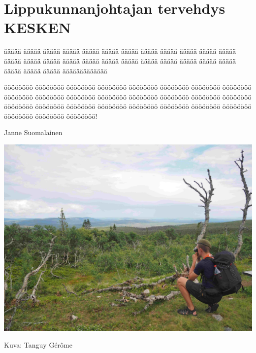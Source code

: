 \section{Lippukunnanjohtajan tervehdys KESKEN}


\begin{multicols}{2}


\noindent äääää äääää äääää äääää äääää äääää äääää äääää äääää äääää äääää äääää äääää äääää äääää äääää äääää äääää äääää äääää äääää äääää äääää äääää äääää äääää äääää äääääääääääää

öööööööö öööööööö öööööööö öööööööö öööööööö öööööööö öööööööö öööööööö öööööööö öööööööö öööööööö öööööööö öööööööö öööööööö öööööööö öööööööö öööööööö öööööööö öööööööö öööööööö öööööööö öööööööö öööööööö öööööööö öööööööö öööööööö öööööööö! \\

\vspace*{0.50cm}

\null\hfill Janne Suomalainen

\end{multicols}


\medskip
\noindent\includegraphics[width=\linewidth]{assets/lpkjtervehdys}

\medskip
\noindent\null\hfill Kuva: Tanguy Gérôme
